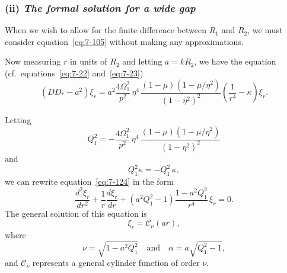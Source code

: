 

\subsubsection*{(ii) \emph{The formal solution for a wide gap}}
When we wish to allow for the finite difference between $R_1$ and $R_2$,
we must consider equation~\eqref{eq:7-105} without making any approximations.

Now measuring $r$ in units of $R_2$ and letting $a = kR_2$, we have the
equation (cf.\ equations~\eqref{eq:7-22} and~\eqref{eq:7-23})
\begin{equation}
\label{eq:7-124}
(DD_*-a^2)\xi_r = a^2\frac{4\Omega_1^2}{p^2}\,\eta^4\,
\frac{(1-\mu)(1-\mu/\eta^2)}{(1-\eta^2)^2}
\!\left(\frac{1}{r^4}-\kappa\right)\xi_r.
\end{equation}

Letting
\begin{equation}
\label{eq:7-125}
Q_1^2 = -\frac{4\Omega_1^2}{p^2}\,\eta^4\,
\frac{(1-\mu)(1-\mu/\eta^2)}{(1-\eta^2)^2}
\end{equation}
and
\begin{equation}
\label{eq:7-126}
Q_1^2\kappa = -Q_1^2\,\kappa,
\end{equation}
we can rewrite equation~\eqref{eq:7-124} in the form
\begin{equation}
\label{eq:7-127}
\frac{d^2\xi_r}{dr^2}+\frac{1}{r}\frac{d\xi_r}{dr}
+ \left(a^2 Q_1^2 - 1\right)\frac{1-a^2 Q_1^2}{r^4}\,\xi_r = 0.
\end{equation}
The general solution of this equation is
\begin{equation}
\label{eq:7-128}
\xi_r = \mathscr{C}_\nu(ar),
\end{equation}
where
\begin{equation}
\label{eq:7-129}
\nu = \sqrt{1-a^2 Q_1^2}
\quad \text{and} \quad
\alpha = a\sqrt{Q_1^2-1},
\end{equation}
and $\mathscr{C}_\nu$ represents a general cylinder function of order $\nu$.

